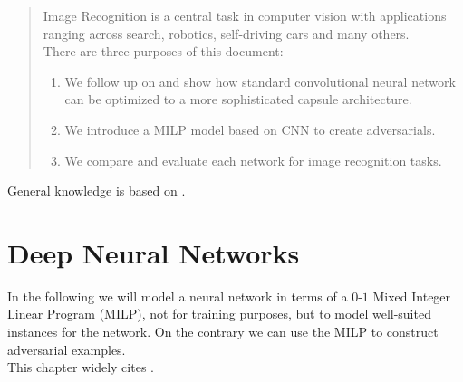 \documentclass{article}
\begin{document}
\setlength{\abovedisplayskip}{10pt}
\setlength{\belowdisplayskip}{10pt}
\setlength{\abovedisplayshortskip}{10pt}
\setlength{\belowdisplayshortskip}{10pt} 


\begin{abstract}
Image Recognition is a central task in computer vision with applications ranging across search, robotics, self-driving cars and many others.\\
There are three purposes of this document:
\begin{enumerate}
\item We follow up on \cite{fischetti17} and show how standard convolutional neural network can be optimized to a more sophisticated capsule architecture. 
\item We introduce a MILP model based on CNN to create adversarials.
\item  We compare and evaluate each network for image recognition tasks.
\end{enumerate}
\end{abstract}
General knowledge is based on \cite{Goodfellow-et-al-2016}.



\section{Deep Neural Networks}
\label{introductionDNN}


In the following we will model a neural network in terms of a $0$-$1$ Mixed Integer Linear Program (MILP), not for training purposes, but to model well-suited instances for the network. On the contrary we can use the MILP to construct adversarial examples.\\
This chapter widely cites \cite{fischetti17}.
\end{document}
